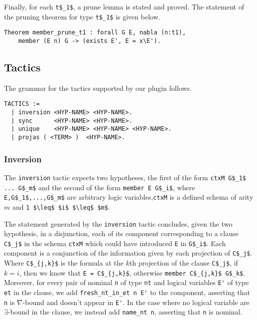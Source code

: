 \documentclass[nocopyrightspace,authoryear]{sigplanconf}
\begin{document}
Finally, for each \lstinline|t$_1$|, a prune lemma is stated and proved. The statement of the pruning theorem for type \lstinline|t$_1$| is given below.
\begin{lstlisting}
Theorem member_prune_t1 : forall G E, nabla (n:t1), 
    member (E n) G -> (exists E', E = x\E').
\end{lstlisting}

\subsection{Tactics}
The grammar for the tactics supported by our plugin follows.
\begin{lstlisting}
TACTICS :=
  | inversion <HYP-NAME> <HYP-NAME>.
  | sync      <HYP-NAME> <HYP-NAME>.
  | unique    <HYP-NAME> <HYP-NAME> <HYP-NAME>.
  | projas ( <TERM> )  <HYP-NAME>.
\end{lstlisting}

\subsubsection{Inversion}
\label{subsec:inv}

The \lstinline|inversion| tactic expects two hypotheses, the first of the form \lstinline|ctxM G$_1$ ... G$_m$| and the second of the form \lstinline|member E G$_i$|, where \lstinline|E,G$_1$,...,G$_m$| are arbitrary logic variables,\lstinline|ctxM| is a defined schema of arity $m$ and \lstinline|1 $\leq$ $i$ $\leq$ $m$|.

The statement generated by the \lstinline|inversion| tactic concludes, given the two hypothesis, in a disjunction, each of its component corresponding to a clause \lstinline|C$_j$| in the schema \lstinline|ctxM| which could have introduced \lstinline|E| in \lstinline|G$_i$|. Each component is a conjunction of the information given by each projection of \lstinline|C$_j$|. Where \lstinline|C$_{j,k}$| is the formula at the $k$th projection of the clause \lstinline|C$_j$|, if $k=i$, then we know that \lstinline|E = C$_{j,k}$|, otherwise \lstinline|member C$_{j,k}$ G$_k$|. Moreover, for every pair of nominal \lstinline|n| of type \lstinline|nt| and logical variables \lstinline|E'| of type \lstinline|et| in the clause, we add \lstinline|fresh_nt_in_et n E'| to the component, asserting that \lstinline|n| is $\nabla$-bound and doesn't appear in \lstinline|E'|. In the case where no logical variable are $\exists$-bound in the clause, we instead add \lstinline|name_nt n|, asserting that \lstinline|n| is nominal.
\end{document}
